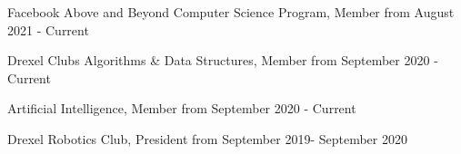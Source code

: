 
\begin{cvskills}

  \cvskill
  {Facebook }
  {Above and Beyond Computer Science Program, Member from August 2021 - Current}

  \cvskill
  {Drexel Clubs}
  {Algorithms \& Data Structures, Member from September 2020 - Current}

  \cvskill
  {}
  {Artificial Intelligence, Member from September 2020 - Current}
  
  \cvskill
  {}
  {Drexel Robotics Club, President from September 2019- September 2020}
\end{cvskills}